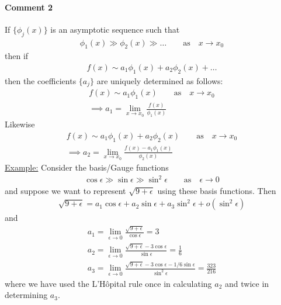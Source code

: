\paragraph{Comment 2}
If $\{\phi_j(x)\}$ is an asymptotic sequence such that
\begin{gather*}
	\phi_1(x) \gg \phi_2(x) \gg \dots \qquad \text{as} \quad x \rightarrow x_0
\end{gather*}
then if 
\begin{gather*}
	f(x) \sim a_1 \phi_1(x) + a_2 \phi_2(x) + \dots
\end{gather*}
then the coefficients $\{a_j\}$ are uniquely determined as follows:
\begin{gather*}
	f(x) \sim a_1 \phi_1(x)\qquad \text{as} \quad x \rightarrow x_0 \\
	\implies a_1 = \lim\limits_{x \rightarrow x_0} \frac{f(x)}{\phi_1(x)}
\end{gather*}
Likewise
\begin{gather*}
	f(x) \sim a_1 \phi_1(x) + a_2 \phi_2(x)\qquad \text{as} \quad x \rightarrow x_0 \\
	\implies a_2 = \lim\limits_{x \rightarrow x_0} \frac{f(x) - a_1 \phi_1(x)}{\phi_2(x)}
\end{gather*}
\underline{Example:} Consider the basis/Gauge functions
\begin{gather*}
	\cos \epsilon \gg \sin \epsilon \gg \sin^2 \epsilon \qquad \text{as} \quad \epsilon \rightarrow 0
\end{gather*}
and suppose we want to represent $\sqrt{9+\epsilon}$ using these basis functions. Then
\begin{gather*}
	\sqrt{9+\epsilon} = a_1 \cos \epsilon + a_2 \sin \epsilon + a_3 \sin^2 \epsilon + o(\sin^2 \epsilon)
\end{gather*}
and
\begin{gather*}
	a_1 = \lim\limits_{\epsilon \rightarrow 0} \frac{\sqrt{9+\epsilon}}{\cos \epsilon} = 3 \\
	a_2 = \lim\limits_{\epsilon \rightarrow 0} \frac{\sqrt{9+\epsilon} - 3 \cos \epsilon}{\sin \epsilon} = \frac{1}{6} \\
	a_3 = \lim\limits_{\epsilon \rightarrow 0} \frac{\sqrt{9+\epsilon} - 3 \cos \epsilon - 1/6 \sin \epsilon}{\sin^2 \epsilon} = \frac{323}{216}
\end{gather*}
where we have used the L'H\^opital rule once in calculating $a_2$ and twice in determining $a_3$.  

